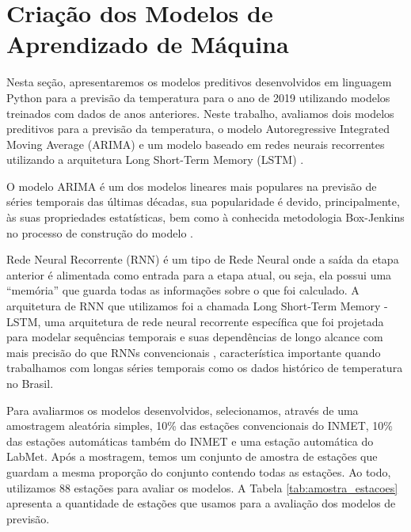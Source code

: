 \chapter{Criação dos Modelos de Aprendizado de Máquina}

Nesta seção, apresentaremos os modelos preditivos desenvolvidos em linguagem Python para a previsão da temperatura para o ano de 2019 utilizando modelos treinados com dados de anos anteriores. Neste trabalho, avaliamos dois modelos preditivos para a previsão da temperatura, o modelo Autoregressive Integrated Moving Average (ARIMA) \cite{whittle1951hypothesis} e um modelo baseado em redes neurais recorrentes utilizando a arquitetura Long Short-Term Memory (LSTM) \cite{hochreiter1997long}.

O modelo ARIMA é um dos modelos lineares mais populares na previsão de séries temporais das últimas décadas, sua popularidade é devido, principalmente, às suas propriedades estatísticas, bem como à conhecida metodologia Box-Jenkins \cite{box2011time} no processo de construção do modelo \cite{zhang2003time}. 

Rede Neural Recorrente (RNN) é um tipo de Rede Neural onde a saída da etapa anterior é alimentada como entrada para a etapa atual, ou seja, ela possui uma “memória” que guarda todas as informações sobre o que foi calculado. A arquitetura de RNN que utilizamos foi a chamada Long Short-Term Memory - LSTM, uma arquitetura de rede neural recorrente específica que foi projetada para modelar sequências temporais e suas dependências de longo alcance com mais precisão do que RNNs convencionais \cite{sak2014long}, característica importante quando trabalhamos com longas séries temporais como os dados histórico de temperatura no Brasil. 

Para avaliarmos os modelos desenvolvidos, selecionamos, através de uma amostragem aleatória simples, 10\% das estações convencionais do INMET, 10\% das estações automáticas também do INMET e uma estação automática do LabMet. Após a mostragem, temos um conjunto de amostra de estações que guardam a mesma proporção do conjunto contendo todas as estações. Ao todo, utilizamos 88 estações para avaliar os modelos.  A Tabela \ref{tab:amostra_estacoes} apresenta a quantidade de estações que usamos para a avaliação dos modelos de previsão.  

